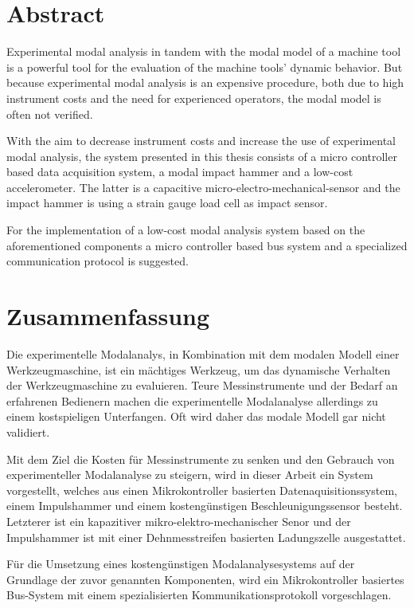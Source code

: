 \chapter*{Abstract}

Experimental modal analysis in tandem with the modal model of a machine tool is a powerful tool for the evaluation of the machine tools' dynamic behavior. But because experimental modal analysis is an expensive procedure, both due to high instrument costs and the need for experienced operators, the modal model is often not verified.

With the aim to decrease instrument costs and increase the use of experimental modal analysis, the system presented in this thesis consists of a micro controller based data acquisition system, a modal impact hammer and a low-cost accelerometer. The latter is a capacitive micro-electro-mechanical-sensor and the impact hammer is using a strain gauge load cell as impact sensor. 

For the implementation of a low-cost modal analysis system based on the aforementioned components a micro controller based bus system and a specialized communication protocol is suggested.

\cleardoublepage
\chapter*{Zusammenfassung}

Die experimentelle Modalanalys, in Kombination mit dem modalen Modell einer Werkzeugmaschine, ist ein mächtiges Werkzeug, um das dynamische Verhalten der Werkzeugmaschine zu evaluieren. Teure Messinstrumente und der Bedarf an erfahrenen Bedienern machen die experimentelle Modalanalyse allerdings zu einem kostspieligen Unterfangen. Oft wird daher das modale Modell gar nicht validiert.

Mit dem Ziel die Kosten für Messinstrumente zu senken und den Gebrauch von experimenteller Modalanalyse zu steigern, wird in dieser Arbeit ein System vorgestellt, welches aus einen Mikrokontroller basierten Datenaquisitionssystem, einem Impulshammer und einem kostengünstigen Beschleunigungssensor besteht. Letzterer ist ein kapazitiver mikro-elektro-mechanischer Senor und der Impulshammer ist mit einer Dehnmesstreifen basierten Ladungszelle ausgestattet.

Für die Umsetzung eines kostengünstigen Modalanalysesystems auf der Grundlage der zuvor genannten Komponenten, wird ein Mikrokontroller basiertes Bus-System mit einem spezialisierten Kommunikationsprotokoll vorgeschlagen.